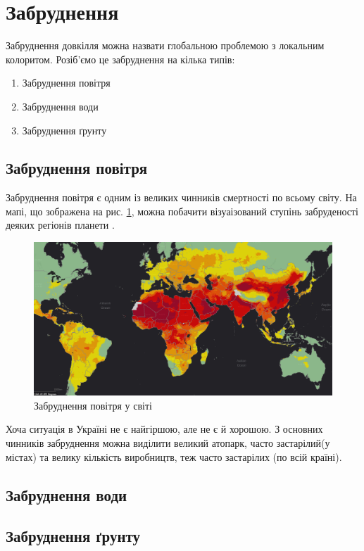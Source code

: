         \section{Забруднення}

        Забруднення довкілля можна назвати глобальною проблемою з локальним колоритом. Розіб'ємо це забруднення на кілька типів:

        \begin{enumerate}
            \item Забруднення повітря
            \item Забруднення води 
            \item Забруднення ґрунту
        \end{enumerate}

        \subsection{Забруднення повітря}
        Забруднення повітря є одним із великих чинників смертності по всьому світу. На мапі, що зображена на рис. \ref{fig:airpol},
        можна побачити візуаізований ступінь забруденості деяких регіонів планети \cite{airpol}.

        \begin{figure}[!htp]
            \centering
            \includegraphics[scale = 0.4]{PNG/airpol.png}
            \caption{Забруднення повітря у світі}
            \label{fig:airpol}
        \end{figure}

        Хоча ситуація в Україні не є найгіршою, але не є й хорошою. З основних чинників забруднення можна виділити великий атопарк, часто
        застарілий(у містах) та велику кількість виробництв, теж часто застарілих (по всій країні).

        \subsection{Забруднення води}
        \subsection{Забруднення ґрунту}